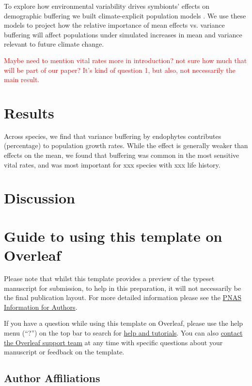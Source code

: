 \documentclass[9pt,twocolumn,twoside,lineno]{pnas-new}
\begin{document}
To explore how environmental variability drives symbionts' effects on demographic buffering we built climate-explicit population models \cite{}. We use these models to project how the relative importance of mean effects vs. variance buffering will affect populations under simulated increases in mean and variance relevant to future climate change. 

\textcolor{red}{Maybe need to mention vital rates more in introduction? not sure how much that will be part of our paper? It's kind of question 1, but also, not necessarily the main result.}



\section*{Results}


Across species, we find that variance buffering by endophytes contributes (percentage) to population growth rates. While the effect is generally weaker than effects on the mean, we found that buffering was common in the most sensitive vital rates, and was most important for xxx species with xxx life history.





\section*{Discussion}

\section*{Guide to using this template on Overleaf}

Please note that whilst this template provides a preview of the typeset manuscript for submission, to help in this preparation, it will not necessarily be the final publication layout. For more detailed information please see the \href{http://www.pnas.org/site/authors/format.xhtml}{PNAS Information for Authors}.

If you have a question while using this template on Overleaf, please use the help menu (``?'') on the top bar to search for \href{https://www.overleaf.com/help}{help and tutorials}. You can also \href{https://www.overleaf.com/contact}{contact the Overleaf support team} at any time with specific questions about your manuscript or feedback on the template.

\subsection*{Author Affiliations}
\end{document}
